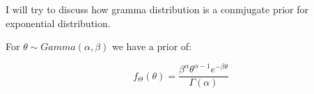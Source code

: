\documentclass[11pt]{article}
\begin{document}
%
%
%
%
%
%
%

I will try to discuss how gramma distribution is a conmjugate prior for exponential distribution.

For $\theta \sim Gamma(\alpha, \beta)$ we have a prior of:

\begin{equation*}
    f_\Theta(\theta) = \frac{\beta^\alpha\theta^{\alpha - 1}e^{-\beta\theta}}{\Gamma(\alpha)}
\end{equation*}
\end{document}
